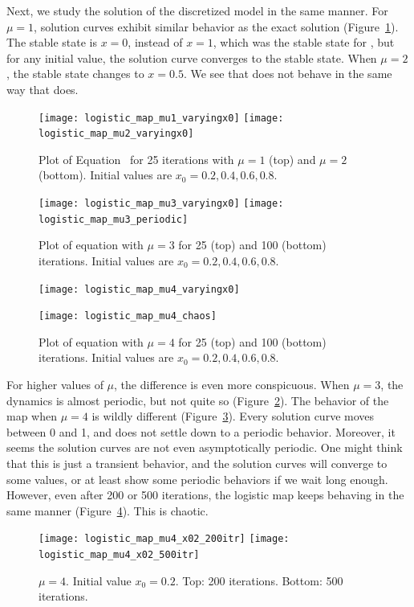\documentclass[12pt,twoside]{book}
\begin{document}
Next, we study the solution of the discretized model  in the same manner.
For $\mu = 1$, solution curves exhibit similar behavior as the exact solution (Figure~\ref{fig:logistic1-2}).
The stable state is $x = 0$, instead of $x = 1$, which was the stable state for , but for any initial value, the solution curve converges to the stable state.
When $\mu = 2$, the stable state changes to $x = 0.5$.
We see that  does not behave in the same way that  does.
\begin{figure}[p]
    \centering
    \texttt{[image: logistic\_map\_mu1\_varyingx0]}
    \texttt{[image: logistic\_map\_mu2\_varyingx0]}
    \caption{
      Plot of Equation~ for 25 iterations with $\mu = 1$ (top) and $\mu = 2$ (bottom).
      Initial values are $x_0 = 0.2, 0.4, 0.6, 0.8$.
    }
    \label{fig:logistic1-2}
\end{figure}
\begin{figure}[p]
    \centering
    \texttt{[image: logistic\_map\_mu3\_varyingx0]}
    \texttt{[image: logistic\_map\_mu3\_periodic]}
    \caption{
      Plot of equation  with $\mu = 3$ for 25 (top) and 100 (bottom) iterations.
      Initial values are $x_0 = 0.2, 0.4, 0.6, 0.8$.
    }
    \label{fig:logistic3}
\end{figure}
\begin{figure}[p]
  \centering
  \texttt{[image: logistic\_map\_mu4\_varyingx0]}

  \texttt{[image: logistic\_map\_mu4\_chaos]}
  \caption{
    Plot of equation  with $\mu = 4$ for 25 (top) and 100 (bottom) iterations.
    Initial values are $x_0 = 0.2, 0.4, 0.6, 0.8$.
  }
  \label{fig:logistic4}
\end{figure}
For higher values of $\mu$, the difference is even more conspicuous.
When $\mu = 3$, the dynamics is almost periodic, but not quite so (Figure~\ref{fig:logistic3}).
The behavior of the map when $\mu = 4$ is wildly different (Figure~\ref{fig:logistic4}).
Every solution curve moves between 0 and 1, and does not settle down to a periodic behavior.
Moreover, it seems the solution curves are not even asymptotically periodic.
One might think that this is just a transient behavior, and the solution curves will converge to some values, or at least show some periodic behaviors if we wait long enough.
However, even after 200 or 500 iterations, the logistic map keeps behaving in the same manner (Figure~\ref{fig:chaotic_map}).
This is chaotic.
\begin{figure}[p]
  \centering
  \texttt{[image: logistic\_map\_mu4\_x02\_200itr]}
  \texttt{[image: logistic\_map\_mu4\_x02\_500itr]}
  \caption{
    $\mu = 4$. Initial value $x_0 = 0.2$.
    Top: 200 iterations. Bottom: 500 iterations.
  }
  \label{fig:chaotic_map}
\end{figure}
\end{document}
